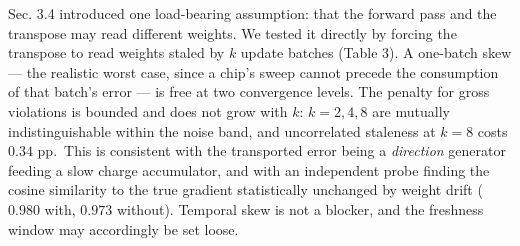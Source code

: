\documentclass[11pt]{article}
\begin{document}
Sec. 3.4 introduced one load-bearing assumption: that the forward pass
and the transpose may read different weights. We tested it directly by
forcing the transpose to read weights staled by \(k\) update batches
(Table 3). A one-batch skew --- the realistic worst case, since a chip's
sweep cannot precede the consumption of that batch's error --- is free
at two convergence levels. The penalty for gross violations is bounded
and does not grow with \(k\): \(k = 2, 4, 8\) are mutually
indistinguishable within the noise band, and uncorrelated staleness at
\(k = 8\) costs \(0.34\) pp.~This is consistent with the transported
error being a \emph{direction} generator feeding a slow charge
accumulator, and with an independent probe finding the cosine similarity
to the true gradient statistically unchanged by weight drift (\(0.980\)
with, \(0.973\) without). Temporal skew is not a blocker, and the
freshness window may accordingly be set loose.
\end{document}
